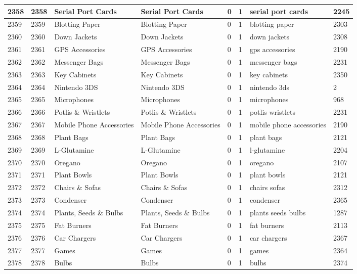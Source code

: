 \begin{longtable}{|l|l|l|l|l|l|l|l|}
2358 & 2358 & Serial Port Cards & Serial Port Cards & 0 & 1 & serial port cards & 2245 \\ \hline 
2359 & 2359 & Blotting Paper & Blotting Paper & 0 & 1 & blotting paper & 2303 \\ \hline 
2360 & 2360 & Down Jackets & Down Jackets & 0 & 1 & down jackets & 2308 \\ \hline 
2361 & 2361 & GPS Accessories & GPS Accessories & 0 & 1 & gps accessories & 2190 \\ \hline 
2362 & 2362 & Messenger Bags & Messenger Bags & 0 & 1 & messenger bags & 2231 \\ \hline 
2363 & 2363 & Key Cabinets & Key Cabinets & 0 & 1 & key cabinets & 2350 \\ \hline 
2364 & 2364 & Nintendo 3DS & Nintendo 3DS & 0 & 1 & nintendo 3ds & 2 \\ \hline 
2365 & 2365 & Microphones & Microphones & 0 & 1 & microphones & 968 \\ \hline 
2366 & 2366 & Potlis \& Wristlets & Potlis \& Wristlets & 0 & 1 & potlis wristlets & 2231 \\ \hline 
2367 & 2367 & Mobile Phone Accessories & Mobile Phone Accessories & 0 & 1 & mobile phone accessories & 2190 \\ \hline 
2368 & 2368 & Plant Bags & Plant Bags & 0 & 1 & plant bags & 2121 \\ \hline 
2369 & 2369 & L-Glutamine & L-Glutamine & 0 & 1 & l-glutamine & 2204 \\ \hline 
2370 & 2370 & Oregano & Oregano & 0 & 1 & oregano & 2107 \\ \hline 
2371 & 2371 & Plant Bowls & Plant Bowls & 0 & 1 & plant bowls & 2121 \\ \hline 
2372 & 2372 & Chairs \& Sofas & Chairs \& Sofas & 0 & 1 & chairs sofas & 2312 \\ \hline 
2373 & 2373 & Condenser & Condenser & 0 & 1 & condenser & 2365 \\ \hline 
2374 & 2374 & Plants, Seeds \& Bulbs & Plants, Seeds \& Bulbs & 0 & 1 & plants seeds bulbs & 1287 \\ \hline 
2375 & 2375 & Fat Burners & Fat Burners & 0 & 1 & fat burners & 2113 \\ \hline 
2376 & 2376 & Car Chargers & Car Chargers & 0 & 1 & car chargers & 2367 \\ \hline 
2377 & 2377 & Games & Games & 0 & 1 & games & 2364 \\ \hline 
2378 & 2378 & Bulbs & Bulbs & 0 & 1 & bulbs & 2374 \\ \hline 

\end{longtable}

